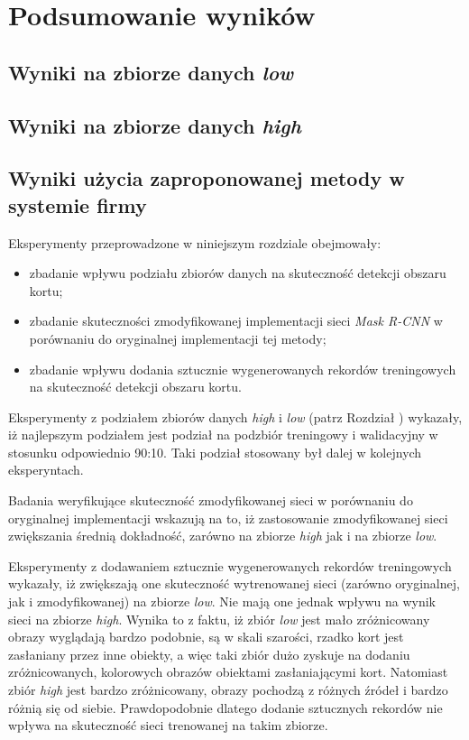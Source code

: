 \section{Podsumowanie wyników}

\subsection{Wyniki na zbiorze danych \textit{low}}
\subsection{Wyniki na zbiorze danych \textit{high}}
\subsection{Wyniki użycia zaproponowanej metody w systemie firmy \blue{}}
\TODO{}

Eksperymenty przeprowadzone w niniejszym rozdziale obejmowały:
\begin{itemize}
 \item zbadanie wpływu podziału zbiorów danych na skuteczność detekcji obszaru kortu;
 \item zbadanie skuteczności zmodyfikowanej implementacji sieci \textit{Mask R-CNN} w porównaniu do oryginalnej implementacji tej metody;
 \item zbadanie wpływu dodania sztucznie wygenerowanych rekordów treningowych na skuteczność detekcji obszaru kortu.
\end{itemize}

Eksperymenty z podziałem zbiorów danych \textit{high} i \textit{low} (patrz Rozdział ) wykazały, iż najlepszym podziałem jest podział na podzbiór treningowy i walidacyjny w stosunku odpowiednio 90:10. Taki podział stosowany był dalej w kolejnych eksperyntach.


Badania weryfikujące skuteczność zmodyfikowanej sieci w porównaniu do oryginalnej implementacji wskazują na to, iż zastosowanie zmodyfikowanej sieci zwiększania średnią dokładność, zarówno na zbiorze \textit{high} jak i na zbiorze \textit{low}.


Eksperymenty z dodawaniem sztucznie wygenerowanych rekordów treningowych wykazały, iż zwiększają one skuteczność wytrenowanej sieci (zarówno oryginalnej, jak i zmodyfikowanej) na zbiorze \textit{low}. Nie mają one jednak wpływu na wynik sieci na zbiorze \textit{high}. Wynika to z faktu, iż zbiór \textit{low} jest mało zróżnicowany obrazy wyglądają bardzo podobnie, są w skali szarości, rzadko kort jest zasłaniany przez inne obiekty, a więc taki zbiór dużo zyskuje na dodaniu zróżnicowanych, kolorowych obrazów obiektami zasłaniającymi kort. Natomiast zbiór \textit{high} jest bardzo zróżnicowany, obrazy pochodzą z różnych źródeł i bardzo różnią się od siebie. Prawdopodobnie dlatego dodanie sztucznych rekordów nie wpływa na skuteczność sieci trenowanej na takim zbiorze.
